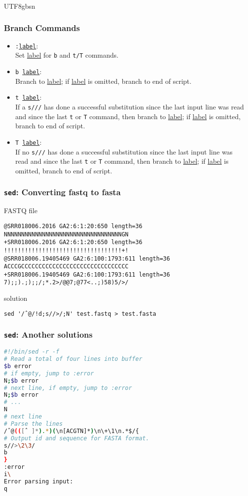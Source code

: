 \documentclass[red]{beamer}
\newcommand*{\lstverb}{\lstinline[style=caret]}
\begin{document}
\begin{CJK*}{UTF8}{gbsn}
\begin{frame}
\frametitle{Branch Commands}
\begin{itemize}
\footnotesize
	\item \texttt{:\underline{label}}: \\Set \underline{label} for 
		\texttt{b} and \texttt{t/T} commands.
	\item \texttt{b \underline{label}}: \\Branch to \underline{label}; 
		if \underline{label} is omitted, branch to end of script.
	\item \texttt{t \underline{label}}: \\If a \lstverb|s///| has done 
		a successful substitution since the last input line was read 
		and since the last \texttt{t} or \texttt{T} command, then branch 
		to \underline{label}; if \underline{label} is omitted, branch to 
		end of script.
	\item \texttt{T \underline{label}}: \\If no \lstverb|s///| has done 
		a successful substitution since the last input line was read 
		and since the last \texttt{t} or \texttt{T} command, then branch 
		to \underline{label}; if \underline{label} is omitted, branch to 
		end of script.
\end{itemize}
\end{frame}

\begin{frame}
\frametitle{\texttt{sed}: Converting fastq to fasta}
\begin{block}{\centering FASTQ file}
\begin{lstlisting}
@SRR018006.2016 GA2:6:1:20:650 length=36
NNNNNNNNNNNNNNNNNNNNNNNNNNNNNNNNNNGN
+SRR018006.2016 GA2:6:1:20:650 length=36
!!!!!!!!!!!!!!!!!!!!!!!!!!!!!!!!!!+!
@SRR018006.19405469 GA2:6:100:1793:611 length=36
ACCCGCCCCCCCCCCCCCCCCCCCCCCCCCCCCCCC
+SRR018006.19405469 GA2:6:100:1793:611 length=36
7);;).;);;/;*.2>/@@7;@77<..;)58)5/>/
\end{lstlisting}
\end{block}
\begin{block}{solution}
\begin{lstlisting}
sed '/ˆ@/!d;s//>/;N' test.fastq > test.fasta
\end{lstlisting}
\end{block}
\end{frame}

\begin{frame}
\frametitle{\texttt{sed}: Another solutions}
\begin{lstlisting}[language=bash]
#!/bin/sed -r -f
# Read a total of four lines into buffer
$b error
# if empty, jump to :error
N;$b error
# next line, if empty, jump to :error
N;$b error
# ...
N
# next line
# Parse the lines
/ˆ@(([ˆ ]*).*)(\n[ACGTN]*)\n\+\1\n.*$/{
# Output id and sequence for FASTA format.
s//>\2\3/
b
}
:error
i\
Error parsing input:
q
\end{lstlisting}
\end{frame}




\end{CJK*}
\end{document}
